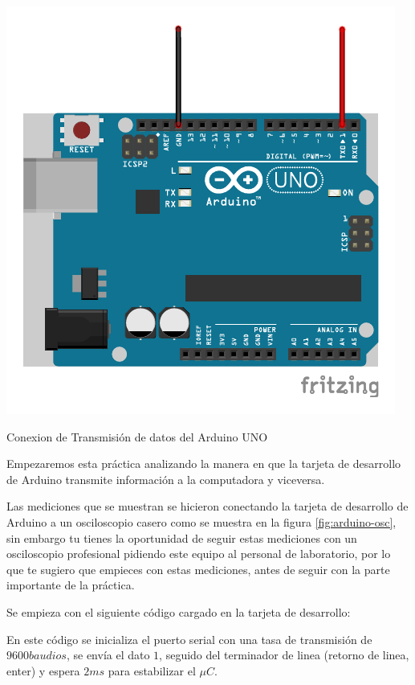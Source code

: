 		\begin{marginfigure}
			\begin{center}
				\includegraphics[width=\textwidth]{images/txosc.pdf}
				\caption{Conexion de Transmisión de datos del Arduino UNO}
				\label{fig:arduino-osc}
			\end{center}
		\end{marginfigure}

		Empezaremos esta práctica analizando la manera en que la tarjeta de desarrollo de Arduino transmite información a la computadora y viceversa.

		Las mediciones que se muestran se hicieron conectando la tarjeta de desarrollo de Arduino a un osciloscopio casero como se muestra en la figura \ref{fig:arduino-osc}, sin embargo tu tienes la oportunidad de seguir estas mediciones con un osciloscopio profesional pidiendo este equipo al personal de laboratorio, por lo que te sugiero que empieces con estas mediciones, antes de seguir con la parte importante de la práctica.

		Se empieza con el siguiente código cargado en la tarjeta de desarrollo:

		

		En este código se inicializa el puerto serial con una tasa de transmisión de $9600 baudios$, se envía el dato $1$, seguido del terminador de linea (retorno de linea, enter) y espera $2ms$ para estabilizar el $\mu C$.

